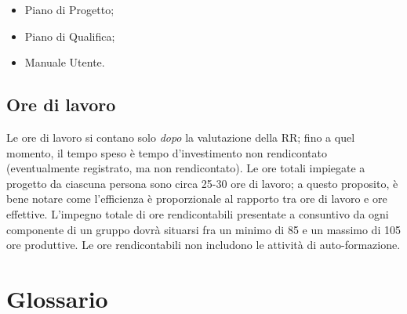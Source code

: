 \documentclass[a4paper]{article}
\begin{document}
	\begin{itemize}
		
			
	\item Piano di Progetto;
			
	\item Piano di Qualifica;
			
	\item Manuale Utente.
		
	\end{itemize}


		
	\subsection{Ore di lavoro}

		
Le ore di lavoro si contano solo \emph{dopo} la valutazione della RR; fino a quel momento, il tempo speso è tempo d'investimento non rendicontato (eventualmente registrato, ma non rendicontato). Le ore totali impiegate a progetto da ciascuna persona sono circa 25-30 ore di lavoro; a questo proposito, è bene notare come l'efficienza è proporzionale al rapporto tra ore di lavoro e ore effettive. L'impegno totale di ore rendicontabili presentate a consuntivo da ogni componente di un gruppo dovrà situarsi fra un minimo di 85 e un massimo di 105 ore produttive. Le ore rendicontabili non includono le attività di auto-formazione.
	


		
	\newpage
	\appendix
	\section{Glossario}
\end{document}
